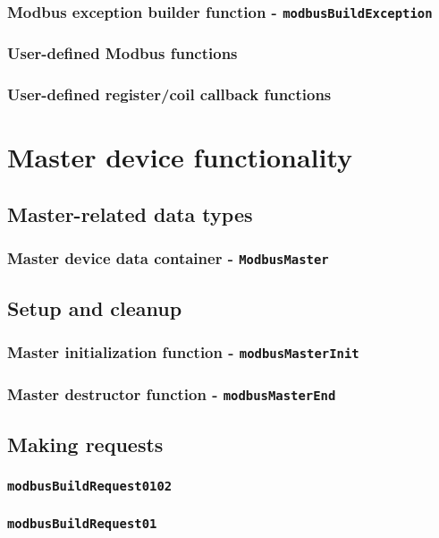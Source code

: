 \documentclass[11pt,a4paper]{article}
\begin{document}
\subsubsection{Modbus exception builder function - \texttt{modbusBuildException}}
\subsubsection{User-defined Modbus functions}
\subsubsection{User-defined register/coil callback functions}

\section{Master device functionality}
\subsection{Master-related data types}
\subsubsection{Master device data container - \texttt{ModbusMaster}}
\subsection{Setup and cleanup}
\subsubsection{Master initialization function - \texttt{modbusMasterInit}}
\subsubsection{Master destructor function - \texttt{modbusMasterEnd}}
\subsection{Making requests}
\subsubsection{\texttt{modbusBuildRequest0102}}
\subsubsection{\texttt{modbusBuildRequest01}}
\end{document}
